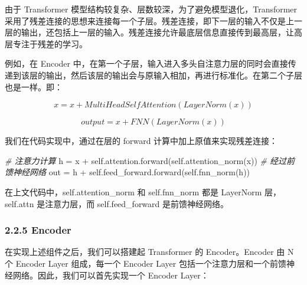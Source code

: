 \documentclass[
]{article}
\newenvironment{Shaded}{}{}
\newcommand{\CommentTok}[1]{\textcolor[rgb]{0.38,0.63,0.69}{\textit{#1}}}
\newcommand{\NormalTok}[1]{#1}
\newcommand{\OperatorTok}[1]{\textcolor[rgb]{0.40,0.40,0.40}{#1}}
\newcommand{\VariableTok}[1]{\textcolor[rgb]{0.10,0.09,0.49}{#1}}
\begin{document}
由于 Transformer
模型结构较复杂、层数较深，\hspace{0pt}为了避免模型退化，Transformer
采用了残差连接的思想来连接每一个子层。残差连接，即下一层的输入不仅是上一层的输出，还包括上一层的输入。残差连接允许最底层信息直接传到最高层，让高层专注于残差的学习。

\hspace{0pt}例如，在 Encoder
中，在第一个子层，输入进入多头自注意力层的同时会直接传递到该层的输出，然后该层的输出会与原输入相加，再进行标准化。在第二个子层也是一样。即：

\[
x = x + MultiHeadSelfAttention(LayerNorm(x))
\]

\[
output = x + FNN(LayerNorm(x))
\]

我们在代码实现中，通过在层的 forward 计算中加上原值来实现残差连接：

\begin{Shaded}
\begin{Highlighting}[]
\CommentTok{\# 注意力计算}
\NormalTok{h }\OperatorTok{=}\NormalTok{ x }\OperatorTok{+} \VariableTok{self}\NormalTok{.attention.forward(}\VariableTok{self}\NormalTok{.attention\_norm(x))}
\CommentTok{\# 经过前馈神经网络}
\NormalTok{out }\OperatorTok{=}\NormalTok{ h }\OperatorTok{+} \VariableTok{self}\NormalTok{.feed\_forward.forward(}\VariableTok{self}\NormalTok{.fnn\_norm(h))}
\end{Highlighting}
\end{Shaded}

在上文代码中，self.attention\_norm 和 self.fnn\_norm 都是 LayerNorm
层，self.attn 是注意力层，而 self.feed\_forward 是前馈神经网络。

\subsubsection{2.2.5 Encoder}\label{encoder}

在实现上述组件之后，我们可以搭建起 Transformer 的 Encoder。Encoder 由 N
个 Encoder Layer 组成，每一个 Encoder Layer
包括一个注意力层和一个前馈神经网络。因此，我们可以首先实现一个 Encoder
Layer：
\end{document}
